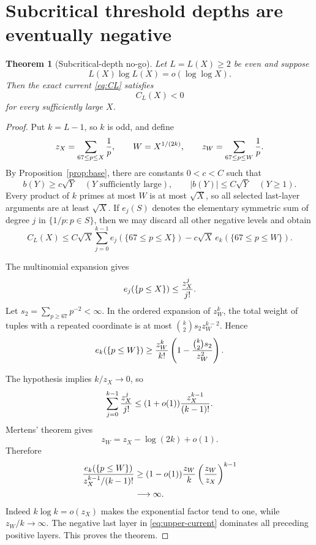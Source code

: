 \documentclass[11pt]{article}
\newtheorem{theorem}{Theorem}[section]
\begin{document}
\section{Subcritical threshold depths are eventually negative}

\begin{theorem}[Subcritical-depth no-go]\label{thm:no-go}
Let $L=L(X)\ge2$ be even and suppose
\[
 L(X)\log L(X)=o(\log\log X).
\]
Then the exact current \eqref{eq:CL} satisfies
\[
 \boxed{C_L(X)<0}
\]
for every sufficiently large $X$.
\end{theorem}

\begin{proof}
Put $k=L-1$, so $k$ is odd, and define
\[
 z_X=\sum_{67\le p\le X}{1\over p},
 \qquad
 W=X^{1/(2k)},
 \qquad
 z_W=\sum_{67\le p\le W}{1\over p}.
\]
By Proposition~\ref{prop:base}, there are constants $0<c<C$ such that
\[
 b(Y)\ge c\sqrt Y\quad(Y\text{ sufficiently large}),
 \qquad
 |b(Y)|\le C\sqrt Y\quad(Y\ge1).
\]
Every product of $k$ primes at most $W$ is at most $\sqrt X$, so all selected
last-layer arguments are at least $\sqrt X$.  If $e_j(S)$ denotes the elementary
symmetric sum of degree $j$ in $\{1/p:p\in S\}$, then we may discard all other
negative levels and obtain
\begin{equation}\label{eq:upper-current}
 C_L(X)
 \le C\sqrt X\sum_{j=0}^{k-1}e_j(\{67\le p\le X\})
 -c\sqrt X\,e_k(\{67\le p\le W\}).
\end{equation}

The multinomial expansion gives
\[
 e_j(\{p\le X\})\le {z_X^j\over j!}.
\]
Let $s_2=\sum_{p\ge67}p^{-2}<\infty$.  In the ordered expansion of $z_W^k$,
the total weight of tuples with a repeated coordinate is at most
$\binom{k}{2}s_2z_W^{k-2}$.  Hence
\begin{equation}\label{eq:eklower}
 e_k(\{p\le W\})
 \ge {z_W^k\over k!}
 \left(1-{\binom{k}{2}s_2\over z_W^2}\right).
\end{equation}

The hypothesis implies $k/z_X\to0$, so
\[
 \sum_{j=0}^{k-1}{z_X^j\over j!}
 \le(1+o(1)){z_X^{k-1}\over(k-1)!}.
\]
Mertens' theorem gives
\[
 z_W=z_X-\log(2k)+o(1).
\]
Therefore
\begin{align*}
 {e_k(\{p\le W\})
  \over z_X^{k-1}/(k-1)!}
 &\ge(1-o(1)){z_W\over k}
 \left({z_W\over z_X}\right)^{k-1}\\
 &\longrightarrow\infty.
\end{align*}
Indeed $k\log k=o(z_X)$ makes the exponential factor tend to one, while
$z_W/k\to\infty$.  The negative last layer in
\eqref{eq:upper-current} dominates all preceding positive layers.  This proves
the theorem.
\end{proof}
\end{document}

